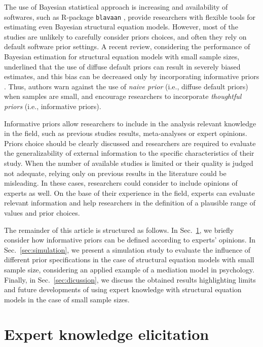 \documentclass[graybox]{svmult}
\begin{document}
The use of Bayesian statistical approach is increasing and availability of softwares, such as R-package \texttt{blavaan} \cite{merkleBlavaanBayesianStructural2018},  provide researchers with flexible tools for estimating even Bayesian structural equation models. However, most of the studies are unlikely to carefully consider priors choices, and often they rely on default software prior settings. A recent review, considering the performance of Bayesian estimation for structural equation models with small sample sizes, underlined that the use of diffuse default priors can result in severely biased estimates, and this bias can be decreased only by incorporating informative priors \cite{smidBayesianFrequentistEstimation2020}. Thus, authors warn against the use of \emph{naive prior} (i.e., diffuse default priors) when samples are small, and encourage researchers to incorporate \emph{thoughtful priors} (i.e., informative priors).

Informative priors allow researchers to include in the analysis relevant knowledge in the field, such as previous studies results, meta-analyses or expert opinions. Priors choice should be clearly discussed and researchers are required to evaluate the generalizability of external information to the specific characteristics of their study. When the number of available studies is limited or their quality is judged not adequate, relying only on previous results in the literature could be misleading. In these cases, researchers could consider to include opinions of experts as well. On the base of their experience in the field, experts can evaluate relevant information and help researchers in the definition of a plausible range of values and prior choices.

The remainder of this article is structured as follows. In Sec.~\ref{sec:expert_elicitation}, we briefly consider how informative priors can be defined according to experts' opinions. In Sec.~\ref{sec:simulation}, we present a simulation study to evaluate the influence of different prior specifications in the case of structural equation models with small sample size, considering an applied example of a mediation model in psychology. Finally, in Sec.~\ref{sec:dicussion}, we discuss the obtained results highlighting limits and future developments of using expert knowledge with structural equation models in the case of  small sample sizes.

\section{Expert knowledge elicitation}
\label{sec:expert_elicitation}
\end{document}
